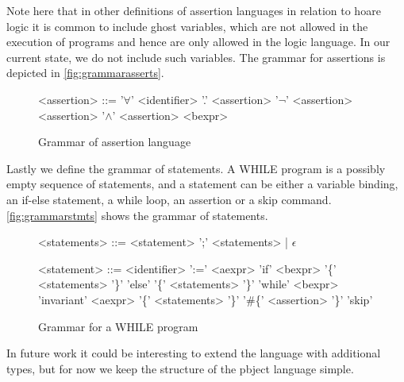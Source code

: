 Note here that in other definitions of assertion languages in relation to hoare logic it is common to include ghost variables, which are not allowed in the execution of programs and hence are only allowed in the logic language. In our current state, we do not include such variables.
The grammar for assertions is depicted in \autoref{fig:grammarasserts}.
\begin{figure}[h!]
\centering
\begin{grammar}
<assertion> ::= '$\forall$' <identifier> '.' <assertion>
\alt '$\neg$' <assertion>
\alt <assertion> '$\wedge$' <assertion>
\alt <bexpr>
\end{grammar}
\label{fig:grammarasserts}
\caption{Grammar of assertion language}
\end{figure}

Lastly we define the grammar of statements. A WHILE program is a possibly empty sequence of statements, and a statement can be either a variable binding, an if-else statement, a while loop, an assertion or a skip command. \autoref{fig:grammarstmts} shows the grammar of statements.

\begin{figure}[h!]
\centering
\begin{grammar}
<statements> ::= <statement> ';' <statements> | $\epsilon$

<statement> ::= <identifier> ':=' <aexpr>
\alt 'if' <bexpr> '\{' <statements> '\}' 'else' '\{' <statements> '\}'
\alt 'while' <bexpr> 'invariant' <aexpr> '\{' <statements> '\}'
\alt '\#\{' <assertion> '\}'
\alt 'skip'
\end{grammar}
\label{fig:grammarstmts}
\caption{Grammar for a WHILE program}
\end{figure}

In future work it could be interesting to extend the language with additional types, but for now we keep the structure of the pbject language simple.
